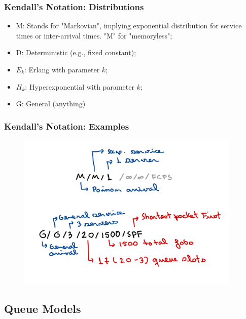 \begin{frame}
    \frametitle{Kendall's Notation: Distributions}
    \begin{itemize}
        \item M: Stands for "Markovian", implying exponential distribution for
        service times or inter-arrival times. "M" for "memoryless";
        \item D: Deterministic (e.g., fixed constant);
        \item $E_k$: Erlang with parameter $k$;
        \item $H_k$: Hyperexponential with parameter $k$;
        \item G: General (anything)
    \end{itemize}
\end{frame}



\begin{frame}
    \frametitle{Kendall's Notation: Examples}
    \begin{figure}
        \centering
        \includegraphics[width=0.95\textwidth]{slides/figures/kendall_examples.pdf}
    \end{figure}
\end{frame}


\subsection{Queue Models}

